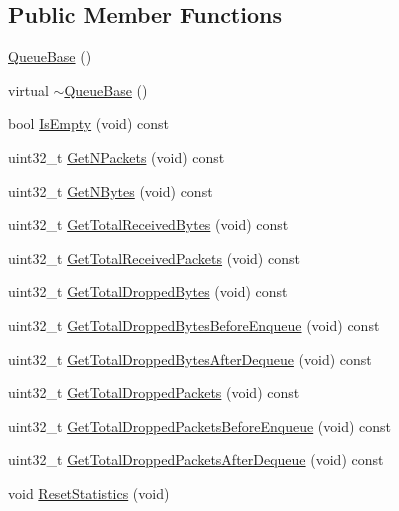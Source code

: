 \subsection*{Public Member Functions}
\begin{DoxyCompactItemize}
\item 
\hyperlink{classns3_1_1QueueBase_abcd8c49940cac764ecbbaa46e0e242dd}{Queue\+Base} ()
\item 
virtual \hyperlink{classns3_1_1QueueBase_a7d57d513b2c08e7b93719c3be7865854}{$\sim$\+Queue\+Base} ()
\item 
bool \hyperlink{classns3_1_1QueueBase_a734525150fe900cddb75bb04b00d46f6}{Is\+Empty} (void) const 
\item 
uint32\+\_\+t \hyperlink{classns3_1_1QueueBase_a9f3c229eeef66e9616d76357826b6568}{Get\+N\+Packets} (void) const 
\item 
uint32\+\_\+t \hyperlink{classns3_1_1QueueBase_affe881df4c0a56813e62094bed5e7f37}{Get\+N\+Bytes} (void) const 
\item 
uint32\+\_\+t \hyperlink{classns3_1_1QueueBase_ac846828adc85705081c96303e9c65077}{Get\+Total\+Received\+Bytes} (void) const 
\item 
uint32\+\_\+t \hyperlink{classns3_1_1QueueBase_a33ea0f8c60e748aab672099d00a73936}{Get\+Total\+Received\+Packets} (void) const 
\item 
uint32\+\_\+t \hyperlink{classns3_1_1QueueBase_a3d4d8ab122b6c02dba7dca06398f6537}{Get\+Total\+Dropped\+Bytes} (void) const 
\item 
uint32\+\_\+t \hyperlink{classns3_1_1QueueBase_ac2f9ae2eaffef5b68e66d3a0e101cb26}{Get\+Total\+Dropped\+Bytes\+Before\+Enqueue} (void) const 
\item 
uint32\+\_\+t \hyperlink{classns3_1_1QueueBase_aadd0411624e6a3edf1c4d3d598cb3bab}{Get\+Total\+Dropped\+Bytes\+After\+Dequeue} (void) const 
\item 
uint32\+\_\+t \hyperlink{classns3_1_1QueueBase_addbce45119e4de318d0ecc7fca449927}{Get\+Total\+Dropped\+Packets} (void) const 
\item 
uint32\+\_\+t \hyperlink{classns3_1_1QueueBase_a202e187f4b4294e5aeae380878b57a77}{Get\+Total\+Dropped\+Packets\+Before\+Enqueue} (void) const 
\item 
uint32\+\_\+t \hyperlink{classns3_1_1QueueBase_aa6b4f13fd6ee63fde3736ddd05872312}{Get\+Total\+Dropped\+Packets\+After\+Dequeue} (void) const 
\item 
void \hyperlink{classns3_1_1QueueBase_a1b5d650f7c6690c3f7ae5ec62828f87b}{Reset\+Statistics} (void)
\item 

\end{DoxyCompactItemize}

